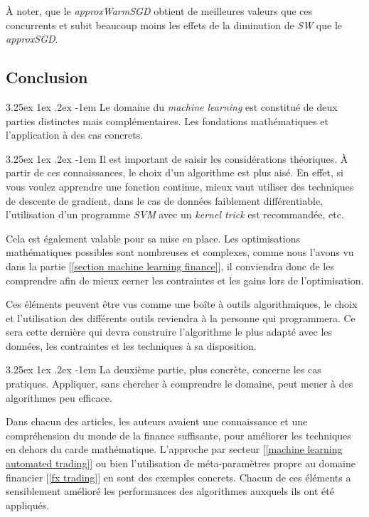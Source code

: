 \documentclass[a4paper, 11pt]{article}
\makeatletter
\renewcommand\paragraph{\@startsection{paragraph}{5}{\z@}%
  {3.25ex \@plus1ex \@minus.2ex}%
  {-1em}%
  {\normalfont\normalsize\bfseries}}
\makeatother
\begin{document}
À noter, que le \textit{approxWarmSGD} obtient de meilleures valeurs que ces concurrents et subit beaucoup moins les effets de la diminution de \textit{SW} que le \textit{approxSGD}.

\subsection{Conclusion}
\paragraph{}
Le domaine du \textit{machine learning} est constitué de deux parties distinctes mais complémentaires.
Les fondations mathématiques et l'application à des cas concrets.

\paragraph{}
Il est important de saisir les considérations théoriques. À partir de ces connaissances, le choix d'un algorithme est plus aisé. En effet, si vous voulez apprendre une fonction continue, mieux vaut utiliser des techniques de descente de gradient, dans le cas de données faiblement différentiable, l'utilisation d'un programme \textit{SVM} avec un \textit{kernel trick} est recommandée, etc.

Cela est également valable pour sa mise en place. Les optimisations mathématiques possibles sont nombreuses et complexes, comme nous l'avons vu dans la partie [\ref{section machine learning finance}], il conviendra donc de les comprendre afin de mieux cerner les contraintes et les gains lors de l'optimisation.

Ces éléments peuvent être vus comme une boîte à outils algorithmiques, le choix et l'utilisation des différents outils reviendra à la personne qui programmera. Ce sera cette dernière qui devra construire l'algorithme le plus adapté avec les données, les contraintes et les techniques à sa disposition.

\paragraph{}
La deuxième partie, plus concrète, concerne les cas pratiques. Appliquer, sans chercher à comprendre le domaine, peut mener à des algorithmes peu efficace.

Dans chacun des articles, les auteurs avaient une connaissance et une compréhension du monde de la finance suffisante, pour améliorer les techniques en dehors du carde mathématique. L'approche par secteur [\ref{machine learning automated trading}] ou bien l'utilisation de méta-paramètres propre au domaine financier [\ref{fx trading}] en sont des exemples concrets.
Chacun de ces éléments a sensiblement amélioré les performances des algorithmes auxquels ils ont été appliqués.
\end{document}
